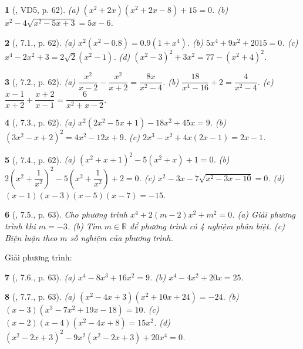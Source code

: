 \documentclass{article}
\newtheorem{baitoan}{}
\begin{document}
\begin{baitoan}[\cite{Binh_boi_duong_Toan_9_tap_2}, VD5, p. 62]
	(a) $(x^2 + 2x)(x^2 + 2x - 8) + 15 = 0$. (b) $x^2 - 4\sqrt{x^2 - 5x + 3} = 5x - 6$.
\end{baitoan}

\begin{baitoan}[\cite{Binh_boi_duong_Toan_9_tap_2}, 7.1., p. 62]
	(a) $x^2(x^2 - 0.8) = 0.9(1 + x^4)$. (b) $5x^4 + 9x^2 + 2015 = 0$. (c) $x^4 - 2x^2 + 3 = 2\sqrt{2}(x^2 - 1)$. (d) $(x^2 - 3)^2 + 3x^2 = 77 - (x^2 + 4)^2$.
\end{baitoan}

\begin{baitoan}[\cite{Binh_boi_duong_Toan_9_tap_2}, 7.2., p. 62]
	(a) $\dfrac{x^2}{x - 2} - \dfrac{x^2}{x + 2} = \dfrac{8x}{x^2 - 4}$. (b) $\dfrac{18}{x^4 - 16} + 2 = \dfrac{4}{x^2 - 4}$. (c) $\dfrac{x - 1}{x + 2} + \dfrac{x + 2}{x - 1} = \dfrac{6}{x^2 + x - 2}$.
\end{baitoan}

\begin{baitoan}[\cite{Binh_boi_duong_Toan_9_tap_2}, 7.3., p. 62]
	(a) $x^2(2x^2 - 5x + 1) - 18x^2 + 45x = 9$. (b) $(3x^2 - x + 2)^2 = 4x^2 - 12x + 9$. (c) $2x^3 - x^2 + 4x(2x - 1) = 2x - 1$.
\end{baitoan}

\begin{baitoan}[\cite{Binh_boi_duong_Toan_9_tap_2}, 7.4., p. 62]
	(a) $(x^2 + x + 1)^2 - 5(x^2 + x) + 1 = 0$. (b) $2\left(x^2 + \dfrac{1}{x^2}\right)^2 - 5\left(x^2 + \dfrac{1}{x^2}\right) + 2 = 0$. (c) $x^2 - 3x - 7\sqrt{x^2 - 3x - 10} = 0$. (d) $(x - 1)(x - 3)(x - 5)(x - 7) = -15$.
\end{baitoan}

\begin{baitoan}[\cite{Binh_boi_duong_Toan_9_tap_2}, 7.5., p. 63]
	Cho phương trình $x^4 + 2(m - 2)x^2 + m^2 = 0$. (a) Giải phương trình khi $m = -3$. (b) Tìm $m\in\mathbb{R}$ để phương trình có 4 nghiệm phân biệt. (c) Biện luận theo $m$ số nghiệm của phương trình.
\end{baitoan}
Giải phương trình:

\begin{baitoan}[\cite{Binh_boi_duong_Toan_9_tap_2}, 7.6., p. 63]
	(a) $x^4 - 8x^3 + 16x^2 = 9$. (b) $x^4 - 4x^2 + 20x = 25$.
\end{baitoan}

\begin{baitoan}[\cite{Binh_boi_duong_Toan_9_tap_2}, 7.7., p. 63]
	(a) $(x^2 - 4x + 3)(x^2 + 10x + 24) = -24$. (b) $(x - 3)(x^3 - 7x^2 + 19x - 18) = 10$. (c) $(x - 2)(x - 4)(x^2 - 4x + 8) = 15x^2$. (d) $(x^2 - 2x + 3)^2 - 9x^2(x^2 - 2x + 3) + 20x^4 = 0$.
\end{baitoan}
\end{document}
